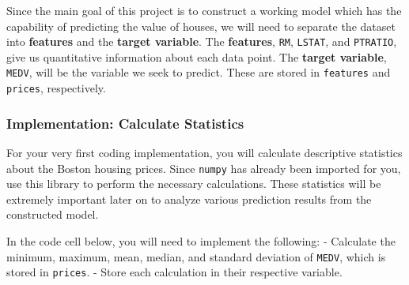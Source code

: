 \documentclass[11pt]{article}
\begin{document}
Since the main goal of this project is to construct a working model
which has the capability of predicting the value of houses, we will need
to separate the dataset into \textbf{features} and the \textbf{target
variable}. The \textbf{features},
\texttt{\textquotesingle{}RM\textquotesingle{}},
\texttt{\textquotesingle{}LSTAT\textquotesingle{}}, and
\texttt{\textquotesingle{}PTRATIO\textquotesingle{}}, give us
quantitative information about each data point. The \textbf{target
variable}, \texttt{\textquotesingle{}MEDV\textquotesingle{}}, will be
the variable we seek to predict. These are stored in \texttt{features}
and \texttt{prices}, respectively.

    \hypertarget{implementation-calculate-statistics}{%
\subsubsection{Implementation: Calculate
Statistics}\label{implementation-calculate-statistics}}

For your very first coding implementation, you will calculate
descriptive statistics about the Boston housing prices. Since
\texttt{numpy} has already been imported for you, use this library to
perform the necessary calculations. These statistics will be extremely
important later on to analyze various prediction results from the
constructed model.

In the code cell below, you will need to implement the following: -
Calculate the minimum, maximum, mean, median, and standard deviation of
\texttt{\textquotesingle{}MEDV\textquotesingle{}}, which is stored in
\texttt{prices}. - Store each calculation in their respective variable.
\end{document}
